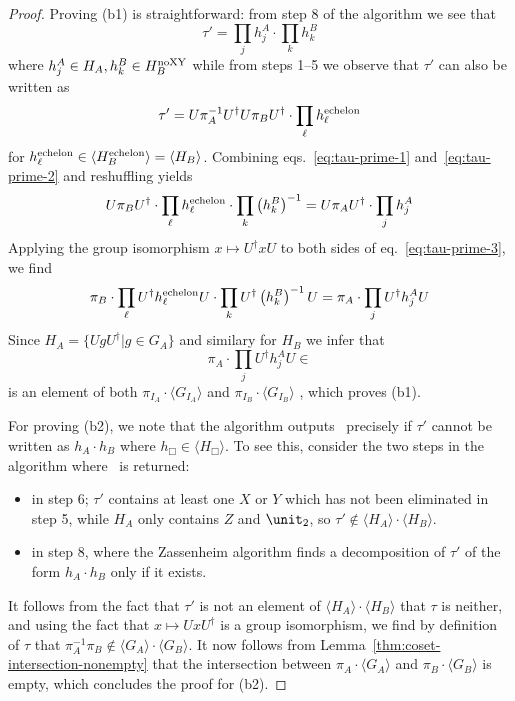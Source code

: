 \begin{proof}
    Proving (b1) is straightforward: from step 8 of the algorithm we see that 
    \begin{equation}
        \label{eq:tau-prime-1}
   \tau' = \prod_{j} h_j^A \cdot \prod_{k} h_k^B
    \end{equation}
    where $h_j^A \in H_A, h_k^B\in H_{B}^{\textnormal{noXY}}$
    while from steps 1--5 we observe that $\tau'$ can also be written as
    \begin{equation}
        \label{eq:tau-prime-2}
        \tau' = U\pi_A^{-1} U^{\dagger} U \pi_B U^{\dagger} \cdot \prod_{\ell} h_{\ell}^{\textnormal{echelon}}
    \end{equation}
 for $h_{\ell}^{\textnormal{echelon}} \in \langle H_B^{\textnormal{echelon}} \rangle = \langle H_B \rangle$.
    Combining eqs.~\eqref{eq:tau-prime-1} and~\eqref{eq:tau-prime-2} and reshuffling yields
    \begin{equation}
        \label{eq:tau-prime-3}
        U \pi_B U^{\dagger} \cdot \prod_{\ell} h_{\ell}^{\textnormal{echelon}}  \cdot \prod_{k} \left(h_k^B\right)^{-1}
        =
        U\pi_A U^{\dagger} \cdot \prod_{j} h_j^A
    \end{equation}
    Applying the group isomorphism $x \mapsto U^{\dagger} x U$ to both sides of eq.~\eqref{eq:tau-prime-3}, we find
    \[
        \pi_B \cdot \prod_{\ell} U^{\dagger} h_{\ell}^{\textnormal{echelon}} U  \cdot \prod_{k} U^{\dagger} \left(h_k^B\right)^{-1} U
        =
        \pi_A \cdot \prod_{j} U^{\dagger} h_j^A U
    \]
    Since $H_A = \{UgU^{\dagger} | g \in G_A\}$ and similary for $H_B$ we infer that
    \[
        \pi_A \cdot \prod_{j} U^{\dagger} h_j^A U \in 
    \]
    is an element of
    both
    $\pi_{I_A} \cdot \langle G_{I_A} \rangle$
    and
    $\pi_{I_B} \cdot \langle G_{I_B} \rangle$
    , which proves (b1).

    For proving (b2), we note that the algorithm outputs \none~precisely if $\tau'$ cannot be written as $h_A \cdot h_B$ where $h_{\Box} \in \langle H_{\Box} \rangle$.
    To see this, consider the two steps in the algorithm where \none~is returned:
    \begin{itemize}
        \item in step 6; $\tau'$ contains at least one $X$ or $Y$ which has not been eliminated in step 5, while $H_A$ only contains $Z$ and $\unit_2$, so $\tau'\notin \langle H_A \rangle \cdot \langle H_B \rangle$.
        \item in step 8, where the Zassenheim algorithm finds a decomposition of $\tau'$ of the form $h_A \cdot h_B$ only if it exists.
    \end{itemize}
It follows from the fact that $\tau'$ is not an element of $\langle H_A \rangle \cdot \langle H_B \rangle$ that $\tau$ is neither, and using the fact that $x\mapsto UxU^{\dagger}$ is a group isomorphism, we find by definition of $\tau$ that $\pi_A^{-1} \pi_B \notin \langle G_A \rangle \cdot \langle G_B\rangle$.
    It now follows from Lemma~\ref{thm:coset-intersection-nonempty} that the intersection between $\pi_A\cdot \langle G_A \rangle$ and $\pi_B\cdot \langle G_B \rangle$ is empty, which concludes the proof for (b2).
\end{proof}
